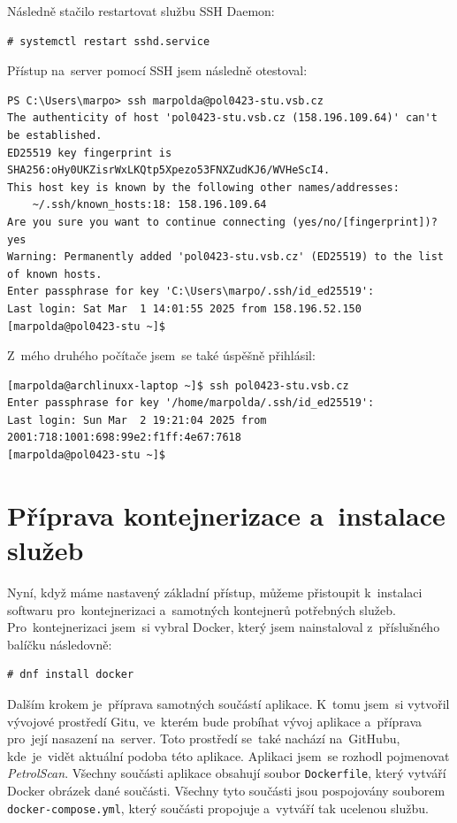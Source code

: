 Následně stačilo restartovat službu SSH Daemon:

\begin{verbatim}
# systemctl restart sshd.service
\end{verbatim}

Přístup na~server pomocí SSH jsem následně otestoval:
\begin{verbatim}
PS C:\Users\marpo> ssh marpolda@pol0423-stu.vsb.cz
The authenticity of host 'pol0423-stu.vsb.cz (158.196.109.64)' can't be established.
ED25519 key fingerprint is SHA256:oHy0UKZisrWxLKQtp5Xpezo53FNXZudKJ6/WVHeScI4.
This host key is known by the following other names/addresses:
    ~/.ssh/known_hosts:18: 158.196.109.64
Are you sure you want to continue connecting (yes/no/[fingerprint])? yes
Warning: Permanently added 'pol0423-stu.vsb.cz' (ED25519) to the list of known hosts.
Enter passphrase for key 'C:\Users\marpo/.ssh/id_ed25519':
Last login: Sat Mar  1 14:01:55 2025 from 158.196.52.150
[marpolda@pol0423-stu ~]$
\end{verbatim}

Z~mého druhého počítače jsem~se také úspěšně přihlásil:
\begin{verbatim}
[marpolda@archlinuxx-laptop ~]$ ssh pol0423-stu.vsb.cz
Enter passphrase for key '/home/marpolda/.ssh/id_ed25519':
Last login: Sun Mar  2 19:21:04 2025 from 2001:718:1001:698:99e2:f1ff:4e67:7618
[marpolda@pol0423-stu ~]$
\end{verbatim}

\section{Příprava kontejnerizace a~instalace služeb}
\label{sec:containers-preps-services-install}

Nyní, když máme nastavený základní přístup, můžeme přistoupit
k~instalaci softwaru pro~kontejnerizaci a~samotných kontejnerů
potřebných služeb. Pro~kontejnerizaci jsem~si vybral Docker,
který jsem nainstaloval z~příslušného balíčku následovně:

\begin{verbatim}
# dnf install docker
\end{verbatim}

Dalším krokem je~příprava samotných součástí aplikace. K~tomu
jsem~si vytvořil vývojové prostředí Gitu, ve~kterém bude
probíhat vývoj aplikace a~příprava pro~její nasazení na~server.
Toto prostředí se~také nachází na~GitHubu, kde~je~vidět
aktuální podoba této aplikace. Aplikaci jsem~se rozhodl pojmenovat
\emph{PetrolScan}. Všechny součásti aplikace obsahují soubor
\texttt{Dockerfile}, který vytváří Docker obrázek dané součásti.
Všechny tyto součásti jsou pospojovány souborem \texttt{docker-compose.yml},
který součásti propojuje a~vytváří tak ucelenou službu.

